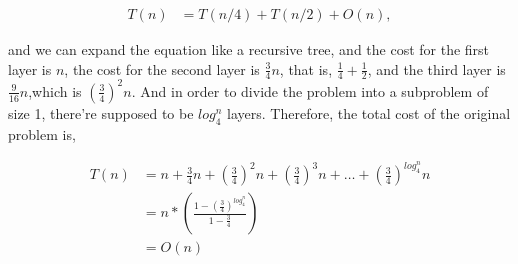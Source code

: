 \documentclass[12pt,letterpaper]{article}
\begin{document}
\begin{itemize}
\begin{itemize}
            $$\begin{aligned}
            T(n)&=T(n/4)+T(n/2)+O(n),
            \end{aligned}$$

            and we can expand the equation like a recursive tree, and the cost for the first layer is $n$, the cost for the second layer is $\frac{3}{4}n$, that is, $\frac{1}{4}+\frac{1}{2}$, and the third layer is $\frac{9}{16}n$,which is $(\frac{3}{4})^2n$. And in order to divide the problem into a subproblem of size 1, there're supposed to be $log_4^n$ layers. Therefore, the total cost of the original problem is,

            $$\begin{aligned}
            T(n)&=n+\frac{3}{4}n+(\frac{3}{4})^2n+(\frac{3}{4})^3n+\dots+(\frac{3}{4})^{log_4^n}n\\
            &=n*(\frac{1-(\frac{3}{4})^{log_4^n}}{1-\frac{3}{4}})\\
            &=O(n)
            \end{aligned}$$
             
        \end{itemize}


\end{itemize}
\end{document}
